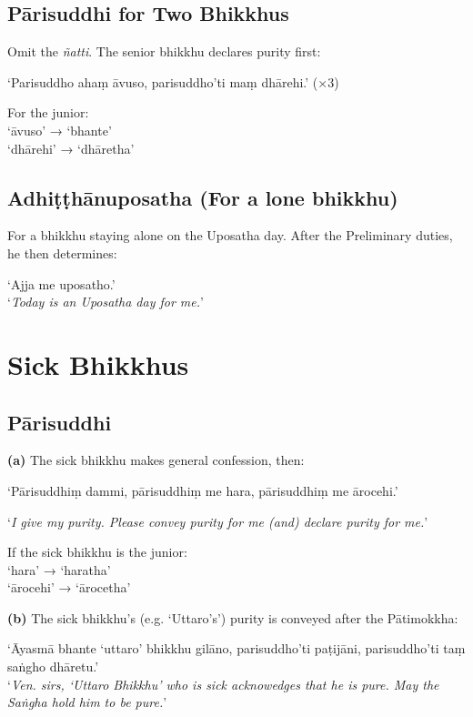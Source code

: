 \subsection{Pārisuddhi for Two Bhikkhus}

Omit the \emph{ñatti}. The senior bhikkhu declares purity first:

‘Parisuddho ahaṃ āvuso, parisuddho'ti maṃ dhārehi.’ (×3)

For the junior:\\
‘āvuso’ → ‘bhante’\\
‘dhārehi’ → ‘dhāretha’

\subsection{Adhiṭṭhānuposatha (For a lone bhikkhu)}

For a bhikkhu staying alone on the Uposatha day. After the Preliminary duties,
he then determines:

‘Ajja me uposatho.’\\
‘\emph{Today is an Uposatha day for me.}’

\section{Sick Bhikkhus}

\subsection{Pārisuddhi}

\textbf{(a)} The sick bhikkhu makes general confession, then:

‘Pārisuddhiṃ dammi, pārisuddhiṃ me hara, pārisuddhiṃ me ārocehi.’

‘\emph{I give my purity. Please convey purity for me (and) declare purity for me.}’

If the sick bhikkhu is the junior:\\
‘hara’ → ‘haratha’\\
‘ārocehi’ → ‘ārocetha’

\clearpage

\textbf{(b)} The sick bhikkhu's (e.g. ‘Uttaro's’) purity is conveyed after the
Pātimokkha:

‘Āyasmā bhante ‘uttaro’ bhikkhu gilāno, parisuddho'ti paṭijāni, parisuddho'ti taṃ saṅgho dhāretu.’\\
‘\emph{Ven. sirs, ‘Uttaro Bhikkhu’ who is sick acknowedges that he is pure. May
  the Saṅgha hold him to be pure.}’

